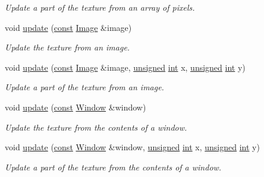 \begin{DoxyCompactItemize}
\begin{DoxyCompactList}\small\item\em Update a part of the texture from an array of pixels. \end{DoxyCompactList}\item 
void \hyperlink{classsf_1_1_texture_a037cdf171af0fb392d07626a44a4ea17}{update} (\hyperlink{term__entry_8h_a57bd63ce7f9a353488880e3de6692d5a}{const} \hyperlink{classsf_1_1_image}{Image} \&image)
\begin{DoxyCompactList}\small\item\em Update the texture from an image. \end{DoxyCompactList}\item 
void \hyperlink{classsf_1_1_texture_a87f916490b757fe900798eedf3abf3ba}{update} (\hyperlink{term__entry_8h_a57bd63ce7f9a353488880e3de6692d5a}{const} \hyperlink{classsf_1_1_image}{Image} \&image, \hyperlink{curses_8priv_8h_aca40206900cfc164654362fa8d4ad1e6}{unsigned} \hyperlink{term__entry_8h_ad65b480f8c8270356b45a9890f6499ae}{int} x, \hyperlink{curses_8priv_8h_aca40206900cfc164654362fa8d4ad1e6}{unsigned} \hyperlink{term__entry_8h_ad65b480f8c8270356b45a9890f6499ae}{int} y)
\begin{DoxyCompactList}\small\item\em Update a part of the texture from an image. \end{DoxyCompactList}\item 
void \hyperlink{classsf_1_1_texture_ad3cceef238f7d5d2108a98dd38c17fc5}{update} (\hyperlink{term__entry_8h_a57bd63ce7f9a353488880e3de6692d5a}{const} \hyperlink{classsf_1_1_window}{Window} \&window)
\begin{DoxyCompactList}\small\item\em Update the texture from the contents of a window. \end{DoxyCompactList}\item 
void \hyperlink{classsf_1_1_texture_a154f246eb8059b602076009ab1cfd175}{update} (\hyperlink{term__entry_8h_a57bd63ce7f9a353488880e3de6692d5a}{const} \hyperlink{classsf_1_1_window}{Window} \&window, \hyperlink{curses_8priv_8h_aca40206900cfc164654362fa8d4ad1e6}{unsigned} \hyperlink{term__entry_8h_ad65b480f8c8270356b45a9890f6499ae}{int} x, \hyperlink{curses_8priv_8h_aca40206900cfc164654362fa8d4ad1e6}{unsigned} \hyperlink{term__entry_8h_ad65b480f8c8270356b45a9890f6499ae}{int} y)
\begin{DoxyCompactList}\small\item\em Update a part of the texture from the contents of a window. \end{DoxyCompactList}\item 

\end{DoxyCompactItemize}
